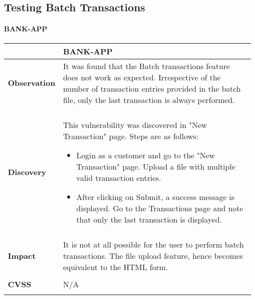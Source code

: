 \subsection{Testing Batch Transactions}
\paragraph{BANK-APP} \mbox{}
\begin{longtable*}{p{.20\textwidth} | p{.80\textwidth}}
    \hline
    & \textbf{BANK-APP} \\
    \hline
    \textbf{Observation} &
      It was found that the Batch transactions feature does not work as expected.
      Irrespective of the number of transaction entries provided in the batch file, only the last transaction is always performed.
    \\\\
    \textbf{Discovery} &
        This vulnerability was discovered in "New Transaction" page. Steps are as follows:
        \begin{itemize}
         \item Login as a customer and go to the "New Transaction" page. Upload a file with multiple valid transaction entries.

         \item After clicking on Submit, a success message is displayed. Go to the Transactions page and note that only the last transaction is displayed.
        \end{itemize}

    \\\\
    \textbf{Impact} &
        It is not at all possible for the user to perform batch transactions. The file upload feature, hence becomes equivalent to the HTML form.
    \\\\
    \textbf{CVSS} &
        N/A
       \\
    \\
    \hline
\end{longtable*}
